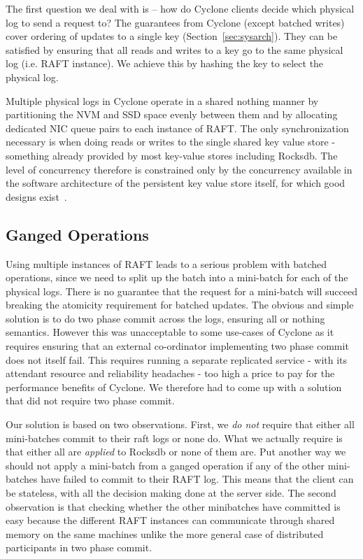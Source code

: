 \documentclass[letterpaper,twocolumn,10pt]{article}
\begin{document}
The first question we deal with is -- how do Cyclone clients decide
which physical log to send a request to? The guarantees from Cyclone
(except batched writes) cover ordering of updates to a single key
(Section~\ref{sec:sysarch}). They can be satisfied by ensuring that
all reads and writes to a key go to the same physical log (i.e. RAFT
instance). We achieve this by hashing the key to select the physical
log.

Multiple physical logs in Cyclone operate in a shared nothing manner
by partitioning the NVM and SSD space evenly between them and by
allocating dedicated NIC queue pairs to each instance of RAFT.  The
only synchronization necessary is when doing reads or writes to the
single shared key value store - something already provided by most
key-value stores including Rocksdb.  The level of concurrency
therefore is constrained only by the concurrency available in the
software architecture of the persistent key value store itself, for
which good designs exist~\cite{flodb}.

\subsection{Ganged Operations}
Using multiple instances of RAFT leads to a serious problem with
batched operations, since we need to split up the batch into a
mini-batch for each of the physical logs. There is no guarantee that
the request for a mini-batch will succeed breaking the atomicity
requirement for batched updates. The obvious and simple solution is to
do two phase commit across the logs, ensuring all or nothing
semantics. However this was unacceptable to some use-cases of Cyclone
as it requires ensuring that an external co-ordinator implementing two
phase commit does not itself fail. This requires running a separate
replicated service - with its attendant resource and reliability
headaches - too high a price to pay for the performance benefits of
Cyclone.  We therefore had to come up with a solution that did not
require two phase commit.

Our solution is based on two observations. First, we \emph {do not}
require that either all mini-batches commit to their raft logs or none
do. What we actually require is that either all are \emph{applied} to
Rocksdb or none of them are. Put another way we should not apply a
mini-batch from a ganged operation if any of the other mini-batches
have failed to commit to their RAFT log. This means that the client
can be stateless, with all the decision making done at the server
side. The second observation is that checking whether the other
minibatches have committed is easy because the different RAFT
instances can communicate through shared memory on the same machines
unlike the more general case of distributed participants in two phase
commit.
\end{document}

